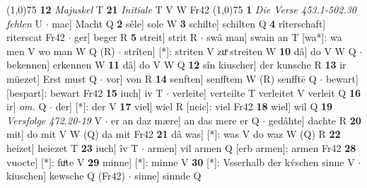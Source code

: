 \documentclass[8pt,a4paper,notitlepage]{article}
\begin{document}
\begin{table}[ht]
\begin{minipage}[t]{0.5\linewidth}
\line(1,0){75} \newline
\textbf{12} \textit{Majuskel} T  \textbf{21} \textit{Initiale} T V W Fr42  \newline
\line(1,0){75} \newline
\textbf{1} \textit{Die Verse 453.1-502.30 fehlen} U   $\cdot$ mac] Macht Q \textbf{2} sêle] sole W \textbf{3} schilte] schilten Q \textbf{4} rîterschaft] riterscat Fr42  $\cdot$ ger] beger R \textbf{5} streit] strit R  $\cdot$ swâ man] swain an T [wa*]: wa men V wo man W Q (R)  $\cdot$ strîten] [*]: striten V zuͦ streiten W \textbf{10} dâ] do V W Q  $\cdot$ bekennen] erkennen W \textbf{11} dâ] do V W Q \textbf{12} sîn kiuscher] der kunsche R \textbf{13} ir müezet] Erst must Q  $\cdot$ vor] von R \textbf{14} senften] senfftem W (R) senfftē Q  $\cdot$ bewart] [bespart]: bewart Fr42 \textbf{15} iuch] iv T  $\cdot$ verleite] verteilte T verleitet V verleit Q \textbf{16} ir] \textit{om.} Q  $\cdot$ der] [*]: der V \textbf{17} viel] wiel R [neic]: viel Fr42 \textbf{18} wiel] wil Q \textbf{19} \textit{Versfolge 472.20-19} V   $\cdot$ er an daz mære] an das mere er Q  $\cdot$ gedâhte] dachte R \textbf{20} mit] do mit V W (Q) da mit Fr42 \textbf{21} dâ was] [*]: was V do waz W (Q) R \textbf{22} heizet] heiezet T \textbf{23} iuch] îv T  $\cdot$ armen] vil armen Q [erb armen]: armen Fr42 \textbf{28} vuocte] [*]: fuͦte V \textbf{29} minne] [*]: minne V \textbf{30} [*]: Vsserhalb der kv́schen sinne V  $\cdot$ kiuschen] kewsche Q (Fr42)  $\cdot$ sinne] sinnde Q \newline
\end{minipage}
\end{table}
\end{document}

